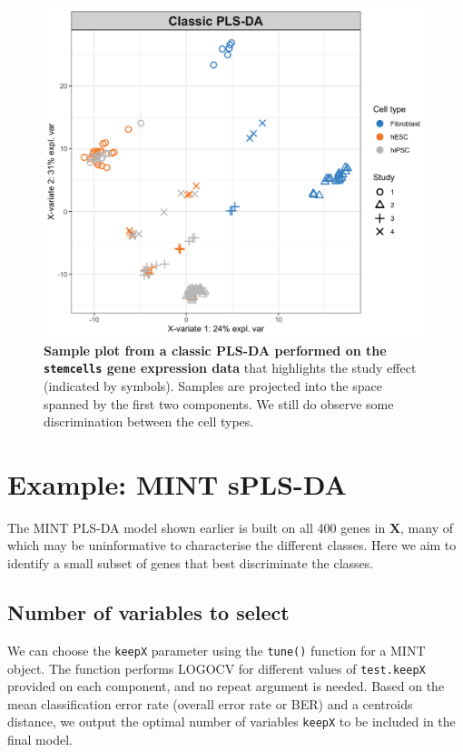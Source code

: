 \documentclass[]{book}
\begin{document}
\begin{figure}

{\centering \includegraphics[width=0.5\linewidth]{Figures/MINT/stem-plsda-indiv-1} 

}

\caption{\textbf{Sample plot from a classic PLS-DA
performed on the \texttt{stemcells} gene expression data} that
highlights the study effect (indicated by symbols). Samples are
projected into the space spanned by the first two components. We still
do observe some discrimination between the cell types.}\label{fig:stem-plsda-indiv}
\end{figure}







\section{Example: MINT sPLS-DA}\label{mint:splsda}

The MINT PLS-DA model shown earlier is built on all 400 genes in
\(\boldsymbol X\), many of which may be uninformative to characterise
the different classes. Here we aim to identify a small subset of genes
that best discriminate the classes.

\subsection{Number of variables to
select}\label{number-of-variables-to-select}

We can choose the \texttt{keepX} parameter using the \texttt{tune()}
function for a MINT object. The function performs LOGOCV for different
values of \texttt{test.keepX} provided on each component, and no repeat
argument is needed. Based on the mean classification error rate (overall
error rate or BER) and a centroids distance, we output the optimal
number of variables \texttt{keepX} to be included in the final model.
\end{document}
